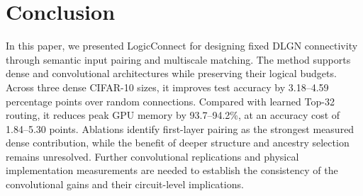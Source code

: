 \section{Conclusion}

In this paper, we presented LogicConnect for designing fixed DLGN connectivity through semantic input pairing and multiscale matching. The method supports dense and convolutional architectures while preserving their logical budgets. Across three dense CIFAR-10 sizes, it improves test accuracy by 3.18–4.59 percentage points over random connections. Compared with learned Top-32 routing, it reduces peak GPU memory by 93.7–94.2\%, at an accuracy cost of 1.84–5.30 points. Ablations identify first-layer pairing as the strongest measured dense contribution, while the benefit of deeper structure and ancestry selection remains unresolved. Further convolutional replications and physical implementation measurements are needed to establish the consistency of the convolutional gains and their circuit-level implications.
